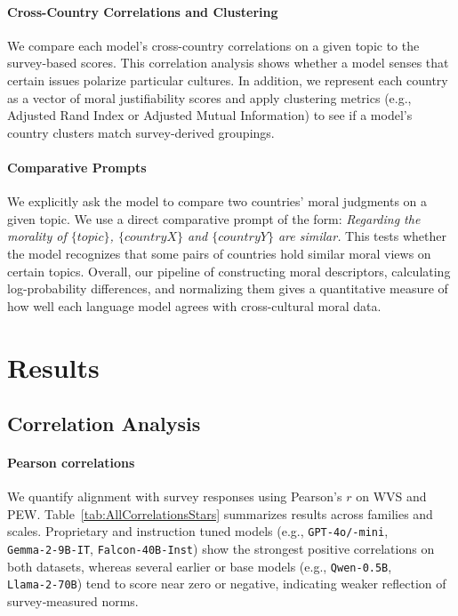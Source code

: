 \documentclass[runningheads]{llncs}
\newcommand{\tabref}[1]{Table~\ref{#1}}
\begin{document}
\paragraph{Cross-Country Correlations and Clustering}
We compare each model's cross-country correlations on a given topic to the survey-based scores. This correlation analysis shows whether a model senses that certain issues polarize particular cultures. In addition, we represent each country as a vector of moral justifiability scores and apply clustering metrics (e.g., Adjusted Rand Index or Adjusted Mutual Information) to see if a model's country clusters match survey-derived groupings.


\paragraph{Comparative Prompts}
We explicitly ask the model to compare two countries' moral judgments on a given topic. We use a direct comparative prompt of the form: {{\emph{Regarding the morality of \(\{topic\}\), \(\{country X\}\) and \(\{country Y\}\) are similar.}}} This tests whether the model recognizes that some pairs of countries hold similar moral views on certain topics. Overall, our pipeline of constructing moral descriptors, calculating log-probability differences, and normalizing them gives a quantitative measure of how well each language model agrees with cross-cultural moral data.

\section{Results}

\subsection{Correlation Analysis}

\paragraph{Pearson correlations}
We quantify alignment with survey responses using Pearson’s $r$ on WVS and PEW. \tabref{tab:AllCorrelationsStars} summarizes results across families and scales. Proprietary and instruction tuned models (e.g., \texttt{GPT‑4o/‑mini}, \texttt{Gemma‑2‑9B‑IT}, \texttt{Falcon‑40B‑Inst}) show the strongest positive correlations on both datasets, whereas several earlier or base models (e.g., \texttt{Qwen‑0.5B}, \texttt{Llama‑2‑70B}) tend to score near zero or negative, indicating weaker reflection of survey‑measured norms.
\end{document}
